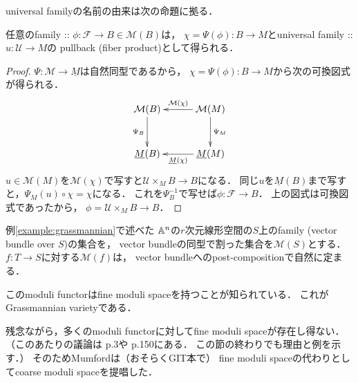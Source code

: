 \documentclass[a4paper]{jsarticle}
\newcommand{\famF}{\mathcal{F}}
\newcommand{\famU}{\mathcal{U}}
\newcommand{\func}[1]{\underline{#1}}
\newcommand{\ftorM}{\mathcal{M}}
\begin{document}
    universal familyの名前の由来は次の命題に拠る．
    \begin{Prop}\label{prop:univfamily}
        任意のfamily :: $\phi: \famF \to B \in \ftorM(B)$は，
        $\chi=\Psi(\phi): B \to M$とuniversal family :: $u: \famU \to M$の
        pullback (fiber product)として得られる．
    \end{Prop}
    \begin{proof}
        $\Psi: \ftorM \to \func{M}$は自然同型であるから，
        $\chi=\Psi(\phi): B \to M$から次の可換図式が得られる．
        \[\xymatrix@=30pt{
                \ftorM(B) \ar[d]_-{\Psi_B}& \ftorM(M) \ar[l]_-{\ftorM(\chi)}\ar[d]^-{\Psi_M}\\
                \func{M}(B) & \ar[l]^-{\func{M}(\chi)} \func{M}(M) \\
        }\]
        $u \in \ftorM(M)$を$\ftorM(\chi)$で写すと$\famU \times_M B \to B$になる．
        同じ$u$を$\func{M}(B)$まで写すと，$\Psi_M(u) \circ \chi=\chi$になる．
        これを$\Psi_B^{-1}$で写せば$\phi:\famF \to B$．
        上の図式は可換図式であったから，
        $\phi=\famU \times_M B \to B$．
    \end{proof}

    \begin{Example}
        例\ref{example:grassmannian}で述べた
        $\mathbb{A}^n$の$r$次元線形空間の$S$上のfamily
        (vector bundle over $S$)の集合を，
        vector bundleの同型で割った集合を$\ftorM(S)$とする．
        $f: T \to S$に対する$\ftorM(f)$は，
        vector bundleへのpost-compositionで自然に定まる．

        このmoduli functorはfine moduli spaceを持つことが知られている．
        これがGrassmannian varietyである．
    \end{Example}

    残念ながら，多くのmoduli functorに対してfine moduli spaceが存在し得ない．
    （このあたりの議論は\cite{HaMo} p.3や\cite{HarDef} p.150にある．
    この節の終わりでも理由と例を示す．）
    そのためMumfordは（おそらくGIT本で）
    fine moduli spaceの代わりとしてcoarse moduli spaceを提唱した．
\end{document}
